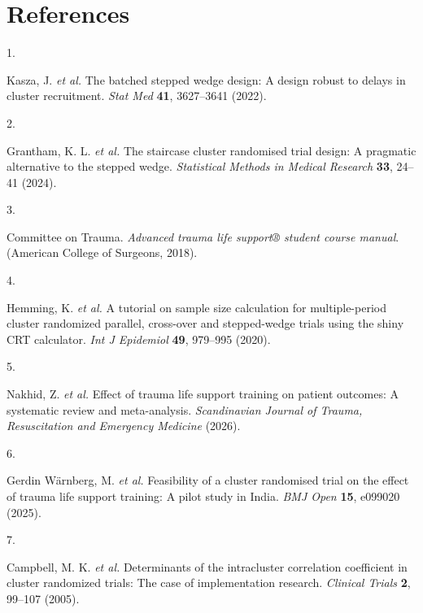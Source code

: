 \documentclass[
]{scrartcl}
\newlength{\cslhangindent}
\newlength{\csllabelwidth}
\newenvironment{CSLReferences}[2] %
 {\begin{list}{}{%
  \setlength{\itemindent}{0pt}
  \setlength{\leftmargin}{0pt}
  \setlength{\parsep}{0pt}
  \ifodd #1
   \setlength{\leftmargin}{\cslhangindent}
   \setlength{\itemindent}{-1\cslhangindent}
  \fi
  \setlength{\itemsep}{#2\baselineskip}}}
 {\end{list}}
\newcommand{\CSLLeftMargin}[1]{\parbox[t]{\csllabelwidth}{\strut#1\strut}}
\newcommand{\CSLRightInline}[1]{\parbox[t]{\linewidth - \csllabelwidth}{\strut#1\strut}}
\begin{document}
\endgroup{}
\par\raggedright

\newpage{}

\section{References}\label{sec-references}

\label{refs}
\begin{CSLReferences}{0}{0}
\CSLLeftMargin{1. }%
\CSLRightInline{Kasza, J. \emph{et al.} The batched stepped wedge
design: A design robust to delays in cluster recruitment. \emph{Stat
Med} \textbf{41}, 3627--3641 (2022).}

\CSLLeftMargin{2. }%
\CSLRightInline{Grantham, K. L. \emph{et al.} The staircase cluster
randomised trial design: {A} pragmatic alternative to the stepped wedge.
\emph{Statistical Methods in Medical Research} \textbf{33}, 24--41
(2024).}

\CSLLeftMargin{3. }%
\CSLRightInline{Committee on Trauma. \emph{Advanced trauma life support®
student course manual}. (American College of Surgeons, 2018).}

\CSLLeftMargin{4. }%
\CSLRightInline{Hemming, K. \emph{et al.} A tutorial on sample size
calculation for multiple-period cluster randomized parallel, cross-over
and stepped-wedge trials using the shiny CRT calculator. \emph{Int J
Epidemiol} \textbf{49}, 979--995 (2020).}

\CSLLeftMargin{5. }%
\CSLRightInline{Nakhid, Z. \emph{et al.} Effect of trauma life support
training on patient outcomes: A systematic review and meta-analysis.
\emph{Scandinavian Journal of Trauma, Resuscitation and Emergency
Medicine} (2026).}

\CSLLeftMargin{6. }%
\CSLRightInline{Gerdin Wärnberg, M. \emph{et al.} Feasibility of a
cluster randomised trial on the effect of trauma life support training:
A pilot study in {India}. \emph{BMJ Open} \textbf{15}, e099020 (2025).}

\CSLLeftMargin{7. }%
\CSLRightInline{Campbell, M. K. \emph{et al.} Determinants of the
intracluster correlation coefficient in cluster randomized trials: The
case of implementation research. \emph{Clinical Trials} \textbf{2},
99--107 (2005).}


\end{CSLReferences}
\end{document}
